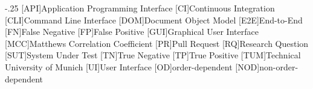 
\begin{acronym}
    \itemsep-.25\baselineskip
    [API]{Application Programming Interface}
    [CI]{Continuous Integration}
    [CLI]{Command Line Interface}
    [DOM]{Document Object Model}
    [E2E]{End-to-End}
    [FN]{False Negative}
    [FP]{False Positive}
    [GUI]{Graphical User Interface}
    [MCC]{Matthews Correlation Coefficient}
    [PR]{Pull Request}
    [RQ]{Research Question}
    [SUT]{System Under Test}
    [TN]{True Negative}
    [TP]{True Positive}
    [TUM]{Technical University of Munich}
    [UI]{User Interface}
    [OD]{order-dependent}
    [NOD]{non-order-dependent}
\end{acronym}
